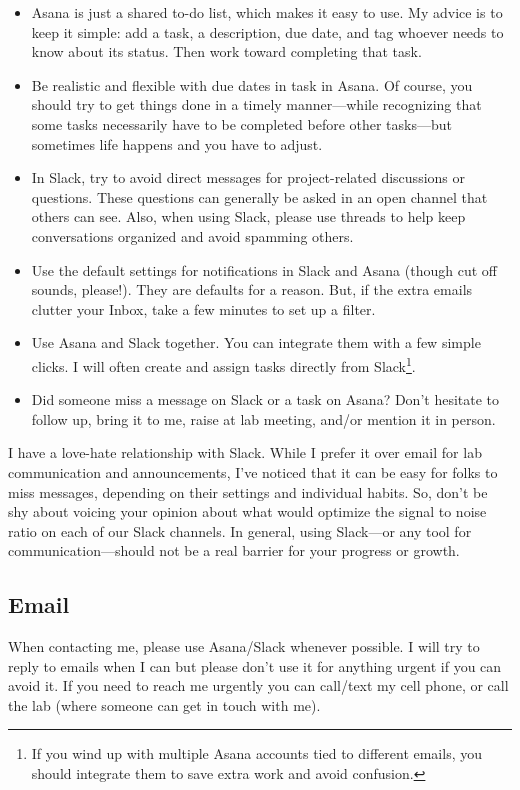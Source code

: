 \documentclass[letterpaper,11pt,oneside]{memoir}
\begin{document}
\begin{itemize}
\item Asana is just a shared to-do list, which makes it easy to use. My advice is to keep it simple: add a task, a description, due date, and tag whoever needs to know about its status. Then work toward completing that task.
\item Be realistic and flexible with due dates in task in Asana. Of course, you should try to get things done in a timely manner---while recognizing that some tasks necessarily have to be completed before other tasks---but sometimes life happens and you have to adjust.
\item In Slack, try to avoid direct messages for project-related discussions or questions. These questions can generally be asked in an open channel that others can see. Also, when using Slack, please use threads to help keep conversations organized and avoid spamming others.
\item Use the default settings for notifications in Slack and Asana (though cut off sounds, please!). They are defaults for a reason. But, if the extra emails clutter your Inbox, take a few minutes to set up a filter.
\item Use Asana and Slack together. You can integrate them with a few simple clicks. I will often create and assign tasks directly from Slack\footnote{If you wind up with multiple Asana accounts tied to different emails, you should integrate them to save extra work and avoid confusion.}.
\item Did someone miss a message on Slack or a task on Asana? Don't hesitate to follow up, bring it to me, raise at lab meeting, and/or mention it in person.
\end{itemize}

\begin{shaded}
\noindent I have a love-hate relationship with Slack. While I prefer it over email for lab communication and announcements, I've noticed that it can be easy for folks to miss messages, depending on their settings and individual habits. So, don't be shy about voicing your opinion about what would optimize the signal to noise ratio on each of our Slack channels. In general, using Slack---or any tool for communication---should not be a real barrier for your progress or growth.
\end{shaded}

\subsection{Email}
When contacting me, please use Asana/Slack whenever possible. I will try to reply to emails when I can but please don't use it for anything urgent if you can avoid it. If you need to reach me urgently you can call/text my cell phone, or call the lab (where someone can get in touch with me). 
\end{document}
